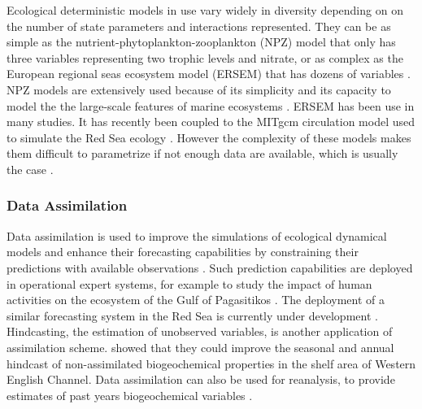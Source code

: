 Ecological deterministic models in use vary widely in diversity depending on on
the number of state parameters and interactions represented.  They can be as
simple as the nutrient-phytoplankton-zooplankton (NPZ) model
\citep{Anderson2005} that only has three variables representing two trophic
levels and nitrate, or as complex as the European regional seas ecosystem model
(ERSEM) that has dozens of variables \citep{Baretta1995}. NPZ models are
extensively used because of its simplicity and its capacity to model the the
large-scale features of marine ecosystems \citep{Anderson2005}.  ERSEM has been
use in many studies. It has recently been coupled to the MITgcm circulation
model used to simulate the Red Sea ecology \citep{Triantafyllou2014}. However
the complexity of these models makes them difficult to parametrize if not
enough data are available, which is usually the case \citep{Anderson2005}.

\subsubsection{Data Assimilation}

Data assimilation is used to improve the simulations of ecological dynamical
models and enhance their forecasting capabilities by constraining their
predictions with available observations \cite{Edwards2015}. Such prediction
capabilities are deployed in operational expert systems, for example to study
the impact of human activities on the ecosystem of the Gulf of Pagasitikos
\citep{Korres2012}. The deployment of a similar forecasting system in the Red
Sea is currently under development \citep{Triantafyllou2014}. Hindcasting, the
estimation of unobserved variables, is another application of assimilation
scheme. \citet{Ciavatta2011}  showed that they could improve the seasonal and
annual hindcast of non-assimilated biogeochemical properties in the shelf area
of Western English Channel. Data assimilation can also be used for reanalysis,
to provide estimates of past years biogeochemical variables
\citep{Fontana2013}. 

